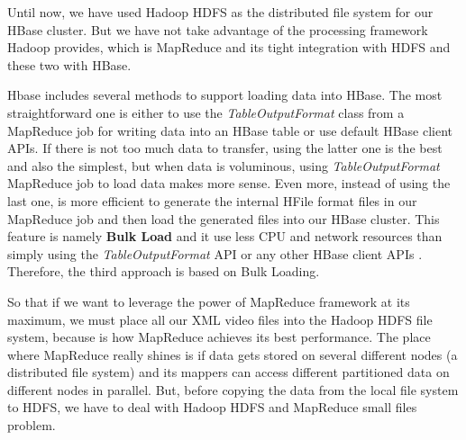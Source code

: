 Until now, we have used Hadoop HDFS as the distributed file system for our HBase cluster. But we have not take advantage of the processing framework Hadoop provides, which is MapReduce and its tight integration with HDFS and these two with HBase.
 \par
Hbase includes several methods to support loading data into HBase. The most straightforward one is either to use the \textit{TableOutputFormat} class from a MapReduce job for writing data into an HBase table or use default HBase client APIs. If there is not too much data to transfer, using the latter one is the best and also the simplest, but when data is voluminous, using \textit{TableOutputFormat} MapReduce job to load data makes more sense. Even more, instead of using the last one, is more efficient to generate the internal HFile format files in our MapReduce job and then load the generated files into our HBase cluster. This feature is namely \textbf{Bulk Load} and it use less CPU and network resources than simply using the \textit{TableOutputFormat} API or any other HBase client APIs \cite{ApacheHBaseBulkLoad}. Therefore, the third approach is based on Bulk Loading.
\par
So that if we want to leverage the power of MapReduce framework at its maximum, we must place all our XML video files into the Hadoop HDFS file system, because is how MapReduce achieves its best performance. The place where MapReduce really shines is if data gets stored on several different nodes (a distributed file system) and its mappers can access different partitioned data on different nodes in parallel. But, before copying the data from the local file system to HDFS, we have to deal with Hadoop HDFS and MapReduce small files problem.

